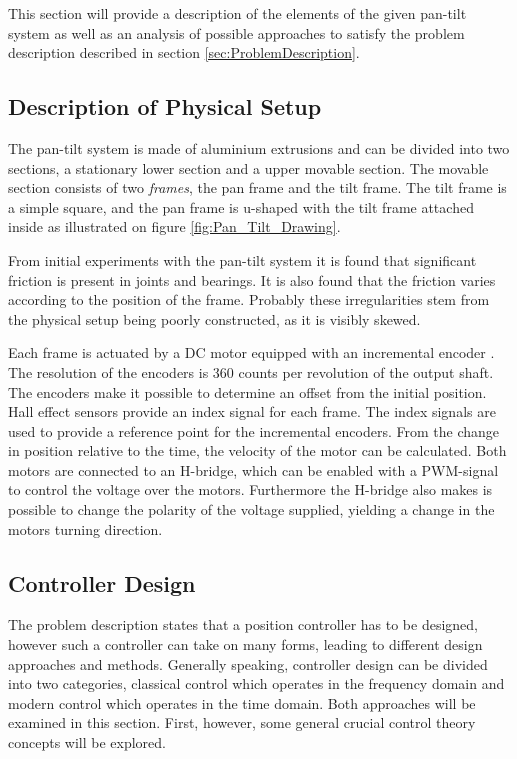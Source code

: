 \documentclass[../../main.tex]{subfiles}
\begin{document}
This section will provide a description of the elements of the given pan-tilt system as well as an analysis of possible approaches to satisfy the problem description described in section \ref{sec:ProblemDescription}.

\subsection{Description of Physical Setup}
The pan-tilt system is made of aluminium extrusions and can be divided into two sections, a stationary lower section and a upper movable section. The movable section consists of two \textit{frames}, the pan frame and the tilt frame. The tilt frame is a simple square, and the pan frame is u-shaped with the tilt frame attached inside as illustrated on figure \ref{fig:Pan_Tilt_Drawing}.

From initial experiments with the pan-tilt system it is found that significant friction is present in joints and bearings. It is also found that the friction varies according to the position of the frame. Probably these irregularities stem from the physical setup being poorly constructed, as it is visibly skewed.  

Each frame is actuated by a DC motor equipped with an incremental encoder \cite{}. The resolution of the encoders is 360 counts per revolution of the output shaft. The encoders make it possible to determine an offset from the initial position. Hall effect sensors \cite{} provide an index signal for each frame. The index signals are used to provide a reference point for the incremental encoders. From the change in position relative to the time, the velocity of the motor can be calculated. Both motors are connected to an H-bridge, which can be enabled with a PWM-signal to control the voltage over the motors. Furthermore the H-bridge also makes is possible to change the polarity of the voltage supplied, yielding a change in the motors turning direction.

\subsection{Controller Design}
The problem description states that a position controller has to be designed, however such a controller can take on many forms, leading to different design approaches and methods. Generally speaking, controller design can be divided into two categories, classical control which operates in the frequency domain and modern control which operates in the time domain. Both approaches will be examined in this section. First, however, some general crucial control theory concepts will be explored.
\end{document}
